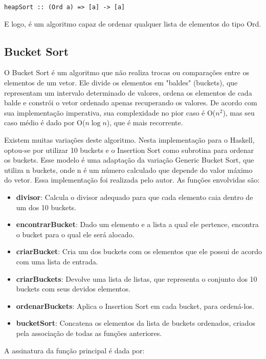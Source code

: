 \documentclass[12pt,a4paper]{article}
\begin{document}
\begin{lstlisting}
heapSort :: (Ord a) => [a] -> [a]
\end{lstlisting}

E logo, é um algoritmo capaz de ordenar qualquer lista de elementos do tipo Ord.


\subsection{Bucket Sort}
O Bucket Sort é um algoritmo que não realiza trocas ou comparações entre os elementos de um vetor. Ele divide os elementos em "baldes" (buckets), que representam um intervalo determinado de valores, ordena os elementos de cada balde e constrói o vetor ordenado apenas recuperando os valores. De acordo com sua implementação imperativa, sua complexidade no pior caso é O($n^2$), mas seu caso médio é dado por O($n \log n$), que é mais recorrente.

Existem muitas variações deste algoritmo. Nesta implementação para o Haskell, optou-se por utilizar 10 buckets e o Insertion Sort como subrotina para ordenar os buckets. Esse modelo é uma adaptação da variação Generic Bucket Sort, que utiliza n buckets, onde n é um número calculado que depende do valor máximo do vetor. Essa implementação foi realizada pelo autor. As funções envolvidas são:

\begin{itemize}
\item \textbf{divisor}: Calcula o divisor adequado para que cada elemento caia dentro de um dos 10 buckets.
\item \textbf{encontrarBucket}: Dado um elemento e a lista a qual ele pertence, encontra o bucket para o qual ele será alocado.
\item \textbf{criarBucket}: Cria um dos buckets com os elementos que ele possui de acordo com uma lista de entrada.
\item \textbf{criarBuckets}: Devolve uma lista de listas, que representa o conjunto dos 10 buckets com seus devidos elementos.
\item \textbf{ordenarBuckets}: Aplica o Insertion Sort em cada bucket, para ordená-los.
\item \textbf{bucketSort}: Concatena os elementos da lista de buckets ordenados, criados pela associação de todas as funções anteriores.
\end{itemize}

A assinatura da função principal é dada por:
\end{document}
